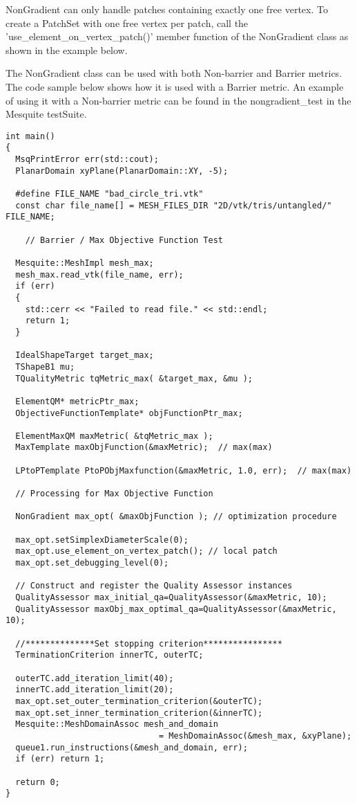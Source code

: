 NonGradient can only handle patches containing exactly one free vertex. To create a PatchSet with one free vertex per patch, call the 'use\_element\_on\_vertex\_patch()' member function of the NonGradient class as shown in the example below. 

The NonGradient class can be used with both Non-barrier and Barrier metrics. The code sample below shows how it is used with a Barrier metric.  An example of using it with a Non-barrier metric can be found in the nongradient\_test in the Mesquite testSuite.

\begin{lstlisting}[frame=single]
int main()
{
  MsqPrintError err(std::cout);
  PlanarDomain xyPlane(PlanarDomain::XY, -5);

  #define FILE_NAME "bad_circle_tri.vtk"
  const char file_name[] = MESH_FILES_DIR "2D/vtk/tris/untangled/" FILE_NAME;

    // Barrier / Max Objective Function Test

  Mesquite::MeshImpl mesh_max;
  mesh_max.read_vtk(file_name, err);
  if (err)
  {
    std::cerr << "Failed to read file." << std::endl;
    return 1;
  }

  IdealShapeTarget target_max;
  TShapeB1 mu;
  TQualityMetric tqMetric_max( &target_max, &mu );

  ElementQM* metricPtr_max;
  ObjectiveFunctionTemplate* objFunctionPtr_max;

  ElementMaxQM maxMetric( &tqMetric_max );
  MaxTemplate maxObjFunction(&maxMetric);  // max(max)

  LPtoPTemplate PtoPObjMaxfunction(&maxMetric, 1.0, err);  // max(max)

  // Processing for Max Objective Function

  NonGradient max_opt( &maxObjFunction ); // optimization procedure 

  max_opt.setSimplexDiameterScale(0);
  max_opt.use_element_on_vertex_patch(); // local patch
  max_opt.set_debugging_level(0);

  // Construct and register the Quality Assessor instances
  QualityAssessor max_initial_qa=QualityAssessor(&maxMetric, 10);
  QualityAssessor maxObj_max_optimal_qa=QualityAssessor(&maxMetric, 10);

  //**************Set stopping criterion****************
  TerminationCriterion innerTC, outerTC;

  outerTC.add_iteration_limit(40);
  innerTC.add_iteration_limit(20);
  max_opt.set_outer_termination_criterion(&outerTC);
  max_opt.set_inner_termination_criterion(&innerTC);
  Mesquite::MeshDomainAssoc mesh_and_domain 
                               = MeshDomainAssoc(&mesh_max, &xyPlane);
  queue1.run_instructions(&mesh_and_domain, err);
  if (err) return 1;

  return 0;
}

\end{lstlisting}

